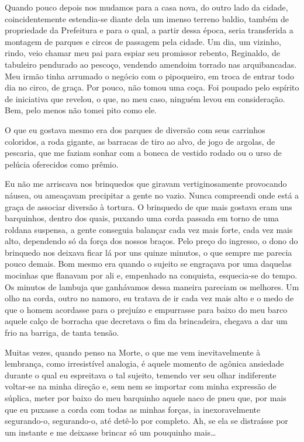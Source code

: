 Quando pouco depois nos mudamos para a casa nova, do outro lado da cidade, coincidentemente estendia-se diante dela um imenso terreno baldio, também de propriedade da Prefeitura e para o qual, a partir dessa época, seria transferida a montagem de parques e circos de passagem pela cidade.
Um dia, um vizinho, rindo, veio chamar meu pai para espiar seu promissor rebento, Reginaldo, de tabuleiro pendurado ao pescoço, vendendo amendoim torrado nas arquibancadas.
Meu irmão tinha arrumado o negócio com o pipoqueiro, em troca de entrar todo dia no circo, de graça.
Por pouco, não tomou uma coça.
Foi poupado pelo espírito de iniciativa que revelou, o que, no meu caso, ninguém levou em consideração.
Bem, pelo menos não tomei pito como ele.

O que eu gostava mesmo era dos parques de diversão com seus carrinhos coloridos, a roda gigante, as barracas de tiro ao alvo, de jogo de argolas, de pescaria, que me faziam sonhar com a boneca de vestido rodado ou o urso de pelúcia oferecidos como prêmio.

Eu não me arriscava nos brinquedos que giravam vertiginosamente provocando náusea, ou ameaçavam precipitar a gente no vazio.
Nunca compreendi onde está a graça de associar diversão à tortura.
O brinquedo de que mais gostava eram uns barquinhos, dentro dos quais, puxando uma corda passada em torno de uma roldana suspensa, a gente conseguia balançar cada vez mais forte, cada vez mais alto, dependendo só da força dos nossos braços.
Pelo preço do ingresso, o dono do brinquedo nos deixava ficar lá por uns quinze minutos, o que sempre me parecia pouco demais.
Bom mesmo era quando o sujeito se engraçava por uma daquelas mocinhas que flanavam por ali e, empenhado na conquista, esquecia-se do tempo.
Os minutos de lambuja que ganhávamos dessa maneira pareciam os melhores.
Um olho na corda, outro no namoro, eu tratava de ir cada vez mais alto e o medo de que o homem acordasse para o prejuízo e empurrasse para baixo do meu barco aquele calço de borracha que decretava o fim da brincadeira, chegava a dar um frio na barriga, de tanta tensão.

Muitas vezes, quando penso na Morte, o que me vem inevitavelmente à lembrança, como irresistível analogia, é aquele momento de agônica ansiedade durante o qual eu espreitava o tal sujeito, temendo ver seu olhar indiferente voltar-se na minha direção e, sem nem se importar com minha expressão de súplica, meter por baixo do meu barquinho aquele naco de pneu que, por mais que eu puxasse a corda com todas as minhas forças, ia inexoravelmente segurando-o, segurando-o, até detê-lo por completo.
Ah, se ela se distraísse por um instante e me deixasse brincar só um pouquinho mais\dots